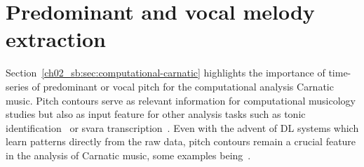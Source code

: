 





\section{Predominant and vocal melody extraction}\label{ch02_sb:sec:pitch-extraction}
Section~\ref{ch02_sb:sec:computational-carnatic} highlights the importance of time-series of predominant or vocal pitch for the computational analysis Carnatic music. Pitch contours serve as relevant information for computational musicology studies but also as input feature for other analysis tasks such as tonic identification~\citep{salamon-tonic} or svara transcription~\citep{dhara-transciption}. 
%
Even with the advent of \acrshort{DL} systems which learn patterns directly from the raw data, pitch contours remain a crucial feature in the analysis of Carnatic music, some examples being~\citep{anand-raga,john-carnatic_classification,nuttall-sancaras}. 
%

